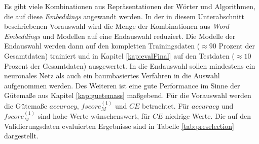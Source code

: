 \documentclass[a4paper,11pt]{article}
\begin{document}
Es gibt viele Kombinationen aus Repräsentationen der Wörter und Algorithmen, die auf diese \textit{Embeddings} angewandt werden. In der in diesem Unterabschnitt beschriebenen Vorauswahl wird die Menge der Kombinationen aus \textit{Word Embeddings} und Modellen auf eine Endauswahl reduziert. Die Modelle der Endauswahl werden dann auf den kompletten Trainingsdaten ($\approx 90$ Prozent der Gesamtdaten) trainiert und in Kapitel \ref{kap:evalFinal} auf den Testdaten ($\approx 10$ Prozent der Gesamtdaten) ausgewertet. In die Endauswahl sollen mindestens ein neuronales Netz als auch ein baumbasiertes Verfahren in die Auswahl aufgenommen werden. Des Weiteren ist eine gute Performance im Sinne der Gütemaße aus Kapitel \ref{kap:guetemass} maßgebend. Für die Vorauswahl werden die Gütemaße $accuracy$, $fscore_M^{(1)}$ und $CE$ betrachtet. Für $accuracy$ und $fscore_M^{(1)}$ sind hohe Werte wünschenswert, für $CE$ niedrige Werte.
Die auf den Validierungsdaten evaluierten Ergebnisse sind in Tabelle \ref{tab:preselection} dargestellt.\\
\end{document}
